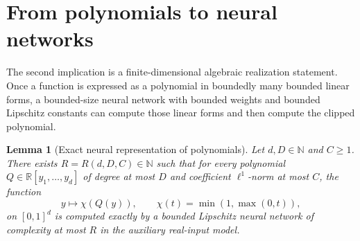 \documentclass[11pt]{amsart}
\newtheorem{lemma}[theorem]{Lemma}
\newcommand{\1}{\mathbf 1}
\begin{document}
\section{From polynomials to neural networks}

The second implication is a finite-dimensional algebraic realization statement.  Once a function is expressed as a polynomial in boundedly many bounded linear forms, a bounded-size neural network with bounded weights and bounded Lipschitz constants can compute those linear forms and then compute the clipped polynomial.  

\begin{lemma}[Exact neural representation of polynomials]\label{lem:universal}
Let \(d,D\in\mathbb N\) and \(C\geq1\).  There exists
\(R=R(d,D,C)\in\mathbb N\) such that for every polynomial
\(Q\in\mathbb R[y_1,\ldots,y_d]\) of degree at most \(D\) and coefficient
\(\ell^1\)-norm at most \(C\), the function
\[
        y\longmapsto \chi(Q(y)),\qquad
        \chi(t)=\min(1,\max(0,t)),
\]
on \([0,1]^d\) is computed exactly by a bounded Lipschitz neural network of
complexity at most \(R\) in the auxiliary real-input model.
\end{lemma}
\end{document}
